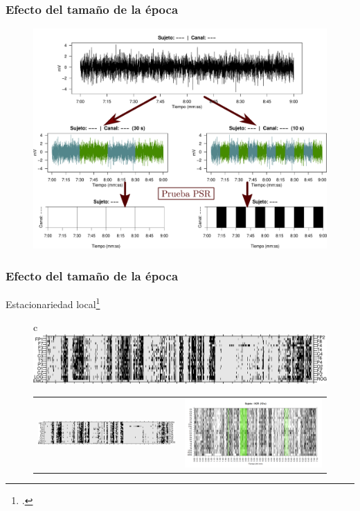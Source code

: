 \documentclass[11pt]{beamer}
\begin{document}
\begin{frame}\frametitle{Efecto del tamaño de la época}
\begin{figure}
\centering
\includegraphics[width=0.9\linewidth]{./img_diagramas/epocas_diferentes.pdf}
\end{figure}
\end{frame}


\begin{frame}\frametitle{Efecto del tamaño de la época}
{\small Estacionariedad local\footcite{Cohen77}}
\begin{figure}
\centering
\begin{tabular}{c}
\includegraphics[width=0.4\linewidth]
{./img_ejemplos/VCNNS1_est_30.png} \\
\begin{tabular}{cc}
\includegraphics[width=0.4\linewidth]
{./img_ejemplos/VCNNS1_est_60.png} 
&
\includegraphics[width=0.4\linewidth]
{./img_ejemplos/VCNNS1_est_10.png} 
\end{tabular}
\end{tabular}
\end{figure}
\end{frame}
\end{document}

